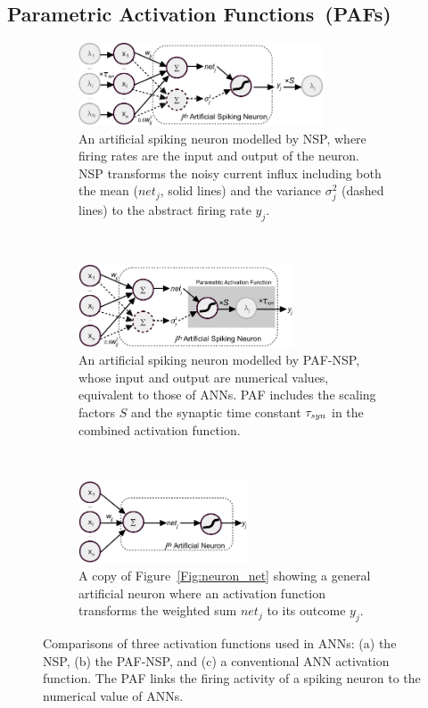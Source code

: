 	\subsection{Parametric Activation Functions~(PAFs)}
	\label{subsec:PAF}
	\begin{figure}[tbh!]
		\centering
		\begin{subfigure}[t]{\textwidth}
			\centering
			\includegraphics[width=0.8\textwidth]{pics_iconip/neuron_o.pdf}
			\caption{An artificial spiking neuron modelled by NSP, where firing rates are the input and output of the neuron. NSP transforms the noisy current influx including both the mean ($net_j$, solid lines) and the variance $\sigma^2_j$ (dashed lines) to the abstract firing rate $y_j$.}
		\end{subfigure}\\\bigskip
		\begin{subfigure}[t]{\textwidth}
			\centering
			\includegraphics[width=0.7\textwidth]{pics_iconip/neuron_PAF.pdf}
			\caption{An artificial spiking neuron modelled by PAF-NSP, whose input and output are numerical values, equivalent to those of ANNs. PAF includes the scaling factors $S$ and the synaptic time constant $\tau_{\textit{\textrm{syn}}}$ in the combined activation function.}
		\end{subfigure}\\\bigskip
		\begin{subfigure}[t]{\textwidth}
			\centering
			\includegraphics[width=0.55\textwidth]{pics_iconip/neuron.pdf}
			\caption{A copy of Figure~\ref{Fig:neuron_net} showing a general artificial neuron where an activation function transforms the weighted sum $net_j$  to its outcome $y_j$.}
		\end{subfigure}
		\caption[Comparisons of three activation functions]{Comparisons of three activation functions used in ANNs: (a) the NSP, (b) the PAF-NSP, and (c) a conventional ANN activation function. The PAF links the firing activity of a spiking neuron to the numerical value of ANNs.}
		\label{Fig:tneuron}
	\end{figure}
	
